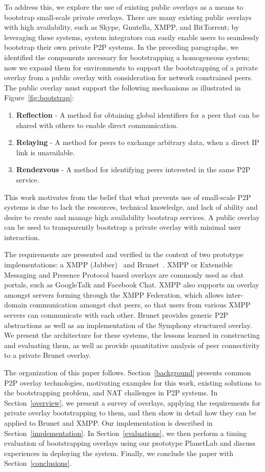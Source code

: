 \documentclass[conference]{IEEEtran}
\begin{document}
To address this, we explore the use of existing public overlays as a means to
bootstrap small-scale private overlays.  There are many existing public
overlays with high availability, such as Skype, Gnutella, XMPP, and BitTorrent;
by leveraging these systems, system integrators can easily enable users to
seamlessly bootstrap their own private P2P systems.  In the preceding
paragraphs, we identified the components necessary for bootstrapping a
homogeneous system; now we expand them for environments to support the
bootstrapping of a private overlay from a public overlay with consideration for
network constrained peers.  The public overlay must support the following
mechanisms as illustrated in Figure~\ref{fig:bootstrap}:
\begin{enumerate}
\item \textbf{Reflection} - A method for obtaining global identifiers for a
peer that can be shared with others to enable direct communication.
\item \textbf{Relaying} - A method for peers to exchange arbitrary data, when
a direct IP link is unavailable.
\item \textbf{Rendezvous} - A method for identifying peers interested in the
same P2P service.
\end{enumerate}
This work motivates from the belief that what prevents use of small-scale P2P
systems is due to lack the resources, technical knowledge, and lack of ability
and desire to create and manage high availability bootstrap services.  A public
overlay can be used to transparently bootstrap a private overlay with minimal
user interaction.

The requirements are presented and verified in the context of two prototype
implementations: a XMPP (Jabber)~\cite{xmpp} and Brunet~\cite{brunet}.  XMPP or
Extensible Messaging and Presence Protocol based overlays are commonly used as
chat portals, such as GoogleTalk and Facebook Chat.  XMPP also supports an
overlay amongst servers forming through the XMPP Federation, which allows
inter-domain communication amongst chat peers, so that users from various XMPP
servers can communicate with each other.  Brunet provides generic P2P
abstractions as well as an implementation of the Symphony structured overlay.
We present the architecture for these systems, the lessons learned in
constructing and evaluating them,  as well as provide quantitative analysis of
peer connectivity to a private Brunet overlay.

The organization of this paper follows.  Section~\ref{background} presents
common P2P overlay technologies, motivating examples for this work, existing
solutions to the bootstrapping problem, and NAT challenges in P2P systems.  In
Section~\ref{overview}, we present a survey of overlays, applying the
requirements for private overlay bootstrapping to them, and then show in detail
how they can be applied to Brunet and XMPP.  Our implementation is described in
Section~\ref{implementation}.  In Section~\ref{evaluations}, we then perform a
timing evaluation of bootstrapping overlays using our prototype PlanetLab and
discuss experiences in deploying the system.  Finally, we conclude the paper
with Section~\ref{conclusions}.
\end{document}
